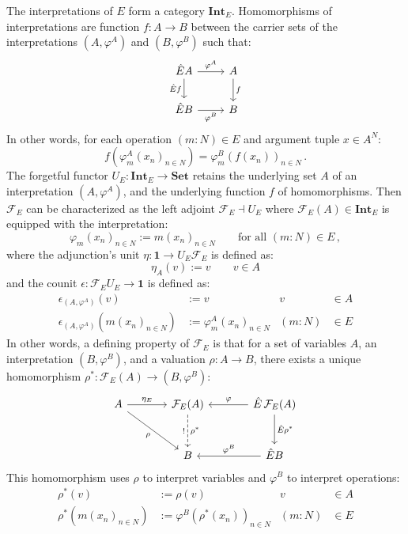 \documentclass[draft,11pt]{report}
\theoremstyle{definition}
\begin{document}
The interpretations of $E$ form a category $\mathbf{Int}_E$.
Homomorphisms of interpretations are
function $f : A \rightarrow B$ between the carrier sets
of the interpretations $(A, \varphi^A)$ and $(B, \varphi^B)$
such that:
\[
  \begin{tikzcd}
    \hat{E} A \ar[r, "\varphi^A"] \ar[d, "\hat{E} f"'] & A \ar[d, "f"] \\
    \hat{E} B \ar[r, "\varphi^B"']                     & B
  \end{tikzcd}
\]
In other words, for each operation $(m:N) \in E$
and argument tuple $x \in A^N$:
\[
  f(\varphi^A_m(x_n)_{n \in N}) = \varphi^B_m(f(x_n))_{n \in N} \,.
\]
The forgetful functor $U_E : \mathbf{Int}_E \rightarrow \mathbf{Set}$
retains the underlying set $A$ of an interpretation $(A, \varphi^A)$,
and the underlying function $f$ of homomorphisms.
Then $\mathcal{F}_E$ can be characterized as the left adjoint
$\mathcal{F}_E \dashv U_E$
where $\mathcal{F}_E(A) \in \mathbf{Int}_E$
is equipped with the interpretation:
\[
  \varphi_m(x_n)_{n \in N} := m(x_n)_{n \in N}
  \qquad
  \text{for all }
  (m:N) \in E \,,
\]
where the adjunction's unit $\eta : \mathbf{1} \rightarrow U_E \mathcal{F}_E$
is defined as:
\[
    \eta_A(v) := v \qquad v \in A
\]
and the counit
$\epsilon : \mathcal{F}_E U_E \rightarrow \mathbf{1}$
is defined as:
\begin{align*}
  \epsilon_{(A, \varphi^A)}(v) &:= v & v &\in A \\
  \epsilon_{(A, \varphi^A)}(m(x_n)_{n \in N}) &:=
    \varphi^A_m(x_n)_{n \in N} & (m:N) &\in E
\end{align*}
In other words,
a defining property of $\mathcal{F}_E$ is that
for a set of variables $A$, an interpretation $(B, \varphi^B)$,
and a valuation $\rho : A \rightarrow B$,
there exists a unique homomorphism
$\rho^* : \mathcal{F}_E(A) \rightarrow (B, \varphi^B)$:
\[
  \begin{tikzcd}[sep=large]
    A \ar[r, "\eta_E"] \ar[dr, "\rho"'] &
      \mathcal{F}_E(A) \ar[d, "!"', "\rho^*", dashed] &
      \hat{E} \, \mathcal{F}_E (A) \ar[l, "\varphi"'] \ar[d, "\hat{E} \rho^*"] \\
    & B  & \hat{E} B \ar[l, "\varphi^B"']
  \end{tikzcd}
\]
This homomorphism uses $\rho$ to interpret variables
and $\varphi^B$ to interpret operations:
\begin{align*}
  \rho^*(v) &:= \rho(v) & v &\in A \\
  \rho^*(m(x_n)_{n \in N}) &:=
    \varphi^B(\rho^*(x_n))_{n \in N} & (m:N) &\in E
\end{align*}
\end{document}
